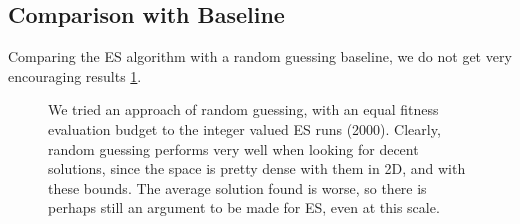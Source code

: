 \subsection{Comparison with Baseline}
Comparing the ES algorithm with a random guessing baseline, we do not get very encouraging results \cref{fig:randomguessingufig}.

\begin{figure}[ht]
    \hfill
    \caption{We tried an approach of random guessing, with an equal fitness evaluation budget to the integer valued ES runs (2000). Clearly, random guessing performs very well when looking for decent solutions, since the space is pretty dense with them in 2D, and with these bounds. The average solution found is worse, so there is perhaps still an argument to be made for ES, even at this scale.}
    \label{fig:randomguessingufig} 
\end{figure} 

